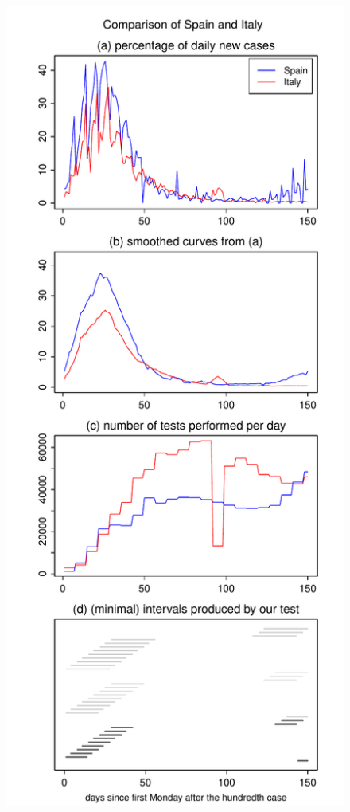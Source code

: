 \documentclass[a4paper,12pt]{article}
\numberwithin{equation}{section}
\begin{document}
\begin{figure}[p!]
\begin{minipage}[t]{0.49\textwidth}
\includegraphics[width=\textwidth]{plots/ESP_vs_ITA_normalised}

\end{minipage}
\end{figure}
\end{document}
